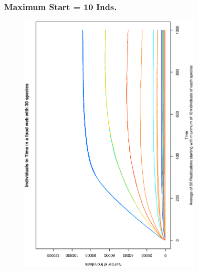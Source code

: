 \documentclass[xcolor=x11names,compress]{beamer}
\renewcommand{\(}{\begin{columns}}
\renewcommand{\)}{\end{columns}}
\newcommand{\<}[1]{\begin{column}{#1}}
\renewcommand{\>}{\end{column}}
\begin{document}
\begin{frame}
\frametitle{Maximum Start = 10 Inds.}
\begin{figure}
\includegraphics[angle=270,width=0.8\textwidth]{./AverIndInTime_50Real_10Ind.eps}
\end{figure}
\end{frame}

\end{document}
